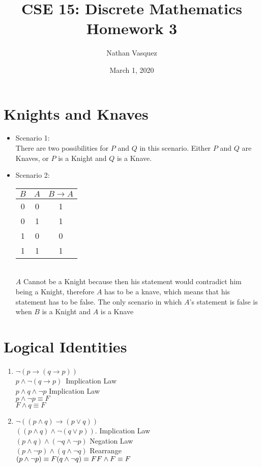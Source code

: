 \documentclass{article}
\title{CSE 15: Discrete Mathematics\\Homework 3}
\author{Nathan Vasquez}
\date{March 1, 2020}
\begin{document}
\maketitle

\section*{Knights and Knaves}

\begin{itemize}
    \item Scenario 1:\\There are two possibilities for $P$ and $Q$ in this scenario. Either $P$ and $Q$ are Knaves, or $P$ is a Knight and $Q$ is a Knave.
    \item Scenario 2:\\
    \begin{center}
    \begin{tabular}{|c|c|c|}
    \hline
    $B$ & $A$ & $B \to A$ \\
    \hline
    0 & 0 & 1 \\
    0 & 1 & 1 \\
    1 & 0 & 0 \\
    1 & 1 & 1 \\
    \hline
    \end{tabular}
    \end{center}\\
    $A$ Cannot be a Knight because then his statement would contradict him being a Knight, therefore $A$ has to be a knave, which means that his statement has to be false. The only scenario in which $A$'s statement is false is when $B$ is a Knight and $A$ is a Knave

\end{itemize}
\section*{Logical Identities}
\begin{enumerate}
    \item $\lnot(p \to (q \to p))$ \\
    $p \land \lnot (q \to p)$\ Implication Law \\
    $p \land q \land \lnot p$ Implication Law \\
    $p \land \lnot p \equiv F$\\
    $F \land q \equiv F$
    \item $\lnot ((p \land q) \to (p \lor q))$\\
    $((p \land q) \land  \lnot(q \lor p))$. Implication Law \\
    $(p \land q) \land (\lnot q \land \lnot p)$ Negation Law\\
    $(p \land \lnot p) \land (q \land \lnot q)$ Rearrange\\
    $(p \land \lnot p) \equiv F
    \\(q \land \lnot q) \equiv F
    \\ F \land F \equiv F$
\end{enumerate}
\end{document}
